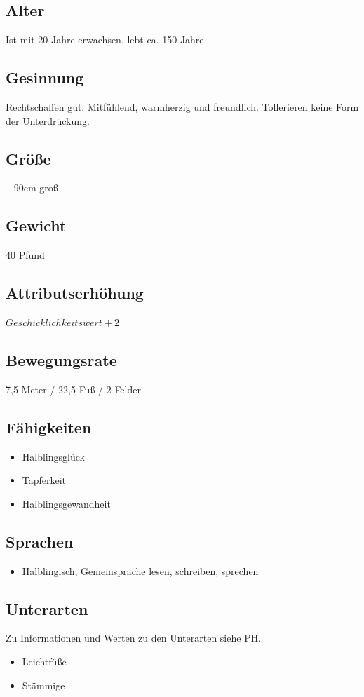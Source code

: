 \subsection*{Alter}
Ist mit 20 Jahre erwachsen. lebt ca. 150 Jahre.

\subsection*{Gesinnung}
Rechtschaffen gut. Mitfühlend, warmherzig und freundlich. Tollerieren keine Form der Unterdrückung.

\subsection*{Größe}
~ 90cm groß

\subsection*{Gewicht}
40 Pfund

\subsection*{Attributserhöhung}
$Geschicklichkeitswert + 2$

\subsection*{Bewegungsrate}
7,5 Meter / 22,5 Fuß / 2 Felder

\subsection*{Fähigkeiten}
\begin{itemize}
	\item Halblingsglück
	\item Tapferkeit
	\item Halblingsgewandheit
\end{itemize}

\subsection*{Sprachen}
\begin{itemize}
	\item Halblingisch, Gemeinsprache
	\subitem lesen, schreiben, sprechen
\end{itemize}

\subsection*{Unterarten}
Zu Informationen und Werten zu den Unterarten siehe PH.
\begin{itemize}
	\item Leichtfüße
	\item Stämmige
\end{itemize}

